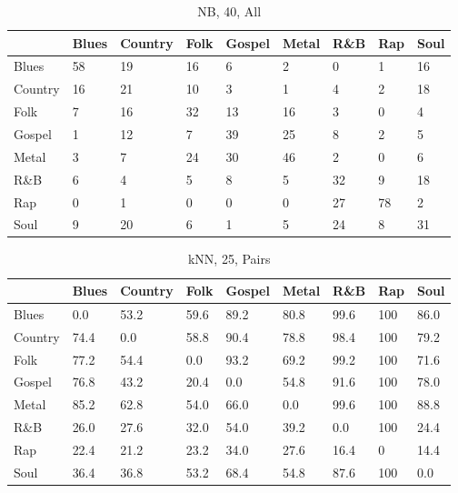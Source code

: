 \documentclass[a4paper,oneside]{article}
\begin{document}
\begin{table}[H]\centering
\caption{NB, 40, All}
\begin{tabu}{l|*{8}{l}}
 & Blues & Country & Folk & Gospel & Metal & R\&B & Rap & Soul \\ \hline
Blues & 58 & 19 & 16 & 6 & 2 & 0 & 1 & 16 \\
Country & 16 & 21 & 10 & 3 & 1 & 4 & 2 & 18 \\
Folk & 7 & 16 & 32 & 13 & 16 & 3 & 0 & 4 \\
Gospel & 1 & 12 & 7 & 39 & 25 & 8 & 2 & 5 \\
Metal & 3 & 7 & 24 & 30 & 46 & 2 & 0 & 6 \\
R\&B & 6 & 4 & 5 & 8 & 5 & 32 & 9 & 18 \\
Rap & 0 & 1 & 0 & 0 & 0 & 27 & 78 & 2 \\
Soul & 9 & 20 & 6 & 1 & 5 & 24 & 8 & 31 \\
\end{tabu}
\end{table}

\begin{table}[H]\centering
\caption{kNN, 25, Pairs}
\begin{tabu}{l|*{8}{l}}
 & Blues & Country & Folk & Gospel & Metal & R\&B & Rap & Soul \\ \hline
Blues & 0.0 & 53.2 & 59.6 & 89.2 & 80.8 & 99.6 & 100 & 86.0 \\
Country & 74.4 & 0.0 & 58.8 & 90.4 & 78.8 & 98.4 & 100 & 79.2 \\
Folk & 77.2 & 54.4 & 0.0 & 93.2 & 69.2 & 99.2 & 100 & 71.6 \\
Gospel & 76.8 & 43.2 & 20.4 & 0.0 & 54.8 & 91.6 & 100 & 78.0 \\
Metal & 85.2 & 62.8 & 54.0 & 66.0 & 0.0 & 99.6 & 100 & 88.8 \\
R\&B & 26.0 & 27.6 & 32.0 & 54.0 & 39.2 & 0.0 & 100 & 24.4 \\
Rap & 22.4 & 21.2 & 23.2 & 34.0 & 27.6 & 16.4 & 0 & 14.4 \\
Soul & 36.4 & 36.8 & 53.2 & 68.4 & 54.8 & 87.6 & 100 & 0.0 \\
\end{tabu}
\end{table}
\end{document}
